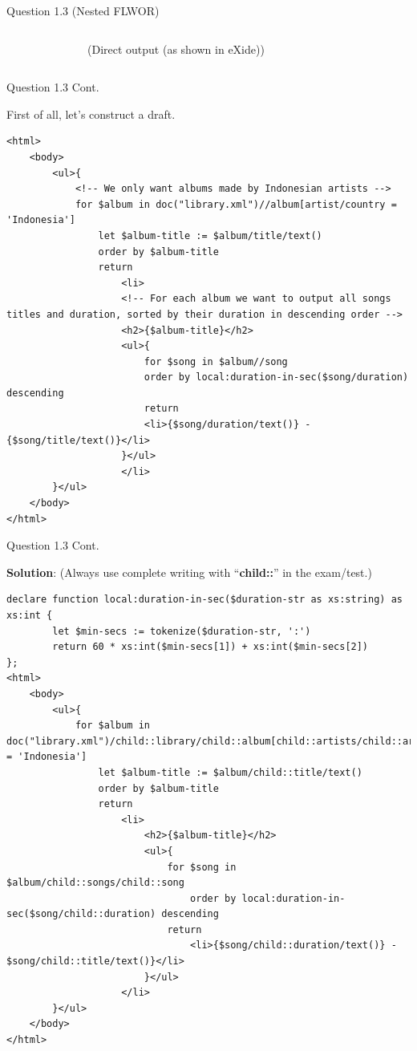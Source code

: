 \begin{frame}[fragile]{Question 1.3 (Nested FLWOR)}
\begin{columns}
\begin{figure}
\end{figure}\vspace{-5pt}
(Direct output (as shown in eXide))
\end{columns}
\end{frame}

\begin{frame}[fragile]{Question 1.3 Cont.}

First of all, let's construct a draft. \\
\begin{lstlisting}[style=xml-small]
<html>
	<body>
		<ul>{
			<!-- We only want albums made by Indonesian artists -->
			for $album in doc("library.xml")//album[artist/country = 'Indonesia']
				let $album-title := $album/title/text()
				order by $album-title
				return
					<li>
					<!-- For each album we want to output all songs titles and duration, sorted by their duration in descending order -->
					<h2>{$album-title}</h2>
					<ul>{
						for $song in $album//song
						order by local:duration-in-sec($song/duration) descending
						return
						<li>{$song/duration/text()} - {$song/title/text()}</li>
					}</ul>
					</li>
		}</ul>
	</body>
</html>
\end{lstlisting}


\end{frame}

\begin{frame}[fragile]{Question 1.3 Cont.}
	
\textbf{Solution}: (Always use complete writing with ``\textbf{child::}'' in the exam/test.)\\
\begin{lstlisting}[style=xml-small-nomargin]
declare function local:duration-in-sec($duration-str as xs:string) as xs:int {
		let $min-secs := tokenize($duration-str, ':')
		return 60 * xs:int($min-secs[1]) + xs:int($min-secs[2])
};
<html>
	<body>
		<ul>{
			for $album in doc("library.xml")/child::library/child::album[child::artists/child::artist/child::country = 'Indonesia']
				let $album-title := $album/child::title/text()
				order by $album-title
				return
					<li>
						<h2>{$album-title}</h2>
						<ul>{
							for $song in $album/child::songs/child::song
								order by local:duration-in-sec($song/child::duration) descending
							return
								<li>{$song/child::duration/text()} - $song/child::title/text()}</li>
						}</ul>
					</li>
		}</ul>
	</body>
</html>
\end{lstlisting}
	
	
\end{frame}

